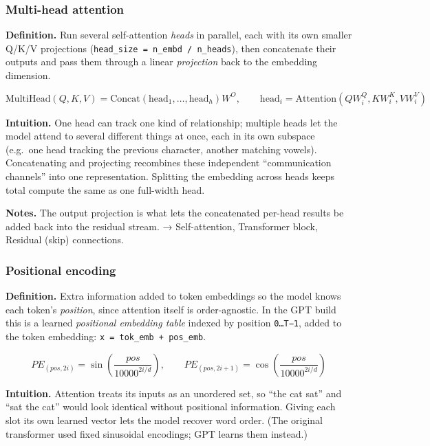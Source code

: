 \documentclass[
  10pt,
  letterpaper,
  onecolumn]{article}
\begin{document}
\hypertarget{multi-head-attention}{%
\subsubsection{Multi-head attention}\label{multi-head-attention}}

\textbf{Definition.} Run several self-attention \emph{heads} in
parallel, each with its own smaller Q/K/V projections
(\texttt{head\_size\ =\ n\_embd\ /\ n\_heads}), then concatenate their
outputs and pass them through a linear \emph{projection} back to the
embedding dimension.

\begin{equation*}
\mathrm{MultiHead}(Q,K,V)=\mathrm{Concat}(\mathrm{head}_1,\dots,\mathrm{head}_h)W^{O},
\qquad
\mathrm{head}_i=\mathrm{Attention}(QW_i^{Q},KW_i^{K},VW_i^{V})
\end{equation*}

\textbf{Intuition.} One head can track one kind of relationship;
multiple heads let the model attend to several different things at once,
each in its own subspace (e.g.~one head tracking the previous character,
another matching vowels). Concatenating and projecting recombines these
independent ``communication channels'' into one representation.
Splitting the embedding across heads keeps total compute the same as one
full-width head.

\textbf{Notes.} The output projection is what lets the concatenated
per-head results be added back into the residual stream. →
Self-attention, Transformer block, Residual (skip) connections.

\hypertarget{positional-encoding}{%
\subsubsection{Positional encoding}\label{positional-encoding}}

\textbf{Definition.} Extra information added to token embeddings so the
model knows each token's \emph{position}, since attention itself is
order-agnostic. In the GPT build this is a learned \emph{positional
embedding table} indexed by position \texttt{0…T−1}, added to the token
embedding: \texttt{x\ =\ tok\_emb\ +\ pos\_emb}.

\begin{equation*}
PE_{(pos,2i)}=\sin\!\left(\frac{pos}{10000^{2i/d}}\right),
\qquad
PE_{(pos,2i+1)}=\cos\!\left(\frac{pos}{10000^{2i/d}}\right)
\end{equation*}

\textbf{Intuition.} Attention treats its inputs as an unordered set, so
``the cat sat'' and ``sat the cat'' would look identical without
positional information. Giving each slot its own learned vector lets the
model recover word order. (The original transformer used fixed
sinusoidal encodings; GPT learns them instead.)
\end{document}
